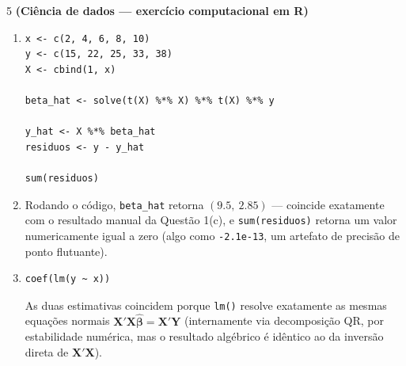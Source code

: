 \documentclass[11pt]{article}
\begin{document}
\begin{questao}{5} \textbf{(Ciência de dados --- exercício computacional em R)}
\end{questao}
\begin{solucao}
\begin{enumerate}[label=(\alph*)]
  \item
\begin{lstlisting}
x <- c(2, 4, 6, 8, 10)
y <- c(15, 22, 25, 33, 38)
X <- cbind(1, x)

beta_hat <- solve(t(X) %*% X) %*% t(X) %*% y

y_hat <- X %*% beta_hat
residuos <- y - y_hat

sum(residuos)
\end{lstlisting}
  \item Rodando o código, \texttt{beta\_hat} retorna $(9.5,\ 2.85)$ --- coincide exatamente com o
    resultado manual da Questão 1(c), e \texttt{sum(residuos)} retorna um valor numericamente
    igual a zero (algo como \texttt{-2.1e-13}, um artefato de precisão de ponto flutuante).
  \item
\begin{lstlisting}
coef(lm(y ~ x))
\end{lstlisting}
    As duas estimativas coincidem porque \texttt{lm()} resolve exatamente as mesmas equações
    normais $\mathbf{X}'\mathbf{X}\hat{\boldsymbol\beta}=\mathbf{X}'\mathbf{Y}$ (internamente via
    decomposição QR, por estabilidade numérica, mas o resultado algébrico é idêntico ao da
    inversão direta de $\mathbf{X}'\mathbf{X}$).
\end{enumerate}
\end{solucao}
\end{document}
